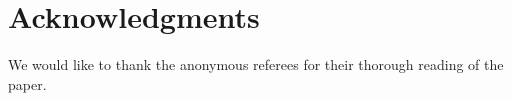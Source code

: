 \documentclass{daj}
\theoremstyle{definition}
\theoremstyle{remark}
\begin{document}


\section*{Acknowledgments} We would like to thank the anonymous referees for their thorough reading of the paper. 


\end{document}
